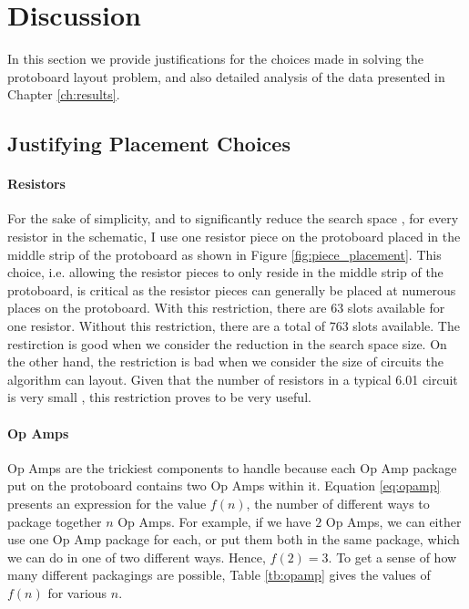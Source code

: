 
\chapter{Discussion}
\label{ch:discussion}

In this section we provide justifications for the choices made in solving the
protoboard layout problem, and also detailed analysis of the data presented in
Chapter \ref{ch:results}.

\section{Justifying Placement Choices}
\label{sec:justify_placement}

\subsubsection{Resistors}

For the sake of simplicity, and to significantly reduce the search space
\q, for every resistor in the schematic, I use one resistor piece on the
protoboard placed in the middle strip of the protoboard as shown in Figure
\ref{fig:piece_placement}. This choice, i.e. allowing the resistor pieces to
only reside in the middle strip of the protoboard, is critical
as the resistor pieces can generally be placed at numerous places on the
protoboard.
With this restriction, there are $63$ slots available for one resistor. Without
this restriction, there are a total of $763$ slots available. The restirction is
good when we consider the reduction in the search space size. On the other hand,
the restriction is bad when we
consider the size of circuits the algorithm can layout. Given that the number
of resistors in a typical 6.01 circuit is very
small \q, this restriction proves to be very useful.

\subsubsection{Op Amps}

Op Amps are the trickiest components to handle because each Op Amp package put
on the protoboard contains two Op Amps within it. Equation
\ref{eq:opamp} presents an expression for the value $f(n)$, the number of
different ways to package together $n$ Op Amps. For example, if we have $2$ Op
Amps, we can either use one Op Amp package for each, or put them both in the
same package, which we can do in one of two different ways. Hence, $f(2) = 3$.
To get a sense of how many different packagings are possible, Table
\ref{tb:opamp} gives the values of $f(n)$ for various $n$.

